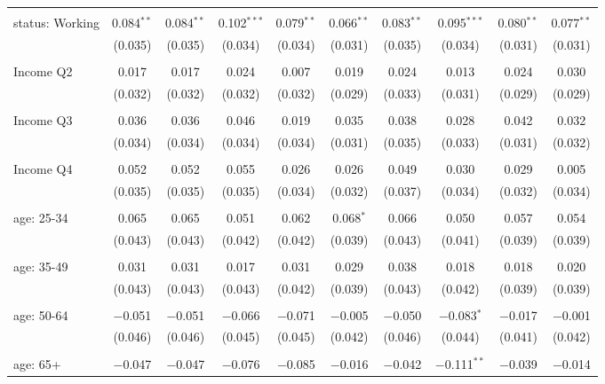 \begin{tabular}{@{\extracolsep{5pt}}lccccccccc}
  & & & & & & & & & \\ 
 status: Working & 0.084$^{**}$ & 0.084$^{**}$ & 0.102$^{***}$ & 0.079$^{**}$ & 0.066$^{**}$ & 0.083$^{**}$ & 0.095$^{***}$ & 0.080$^{**}$ & 0.077$^{**}$ \\ 
  & (0.035) & (0.035) & (0.034) & (0.034) & (0.031) & (0.035) & (0.034) & (0.031) & (0.031) \\ 
  & & & & & & & & & \\ 
 Income Q2 & 0.017 & 0.017 & 0.024 & 0.007 & 0.019 & 0.024 & 0.013 & 0.024 & 0.030 \\ 
  & (0.032) & (0.032) & (0.032) & (0.032) & (0.029) & (0.033) & (0.031) & (0.029) & (0.029) \\ 
  & & & & & & & & & \\ 
 Income Q3 & 0.036 & 0.036 & 0.046 & 0.019 & 0.035 & 0.038 & 0.028 & 0.042 & 0.032 \\ 
  & (0.034) & (0.034) & (0.034) & (0.034) & (0.031) & (0.035) & (0.033) & (0.031) & (0.032) \\ 
  & & & & & & & & & \\ 
 Income Q4 & 0.052 & 0.052 & 0.055 & 0.026 & 0.026 & 0.049 & 0.030 & 0.029 & 0.005 \\ 
  & (0.035) & (0.035) & (0.035) & (0.034) & (0.032) & (0.037) & (0.034) & (0.032) & (0.034) \\ 
  & & & & & & & & & \\ 
 age: 25-34 & 0.065 & 0.065 & 0.051 & 0.062 & 0.068$^{*}$ & 0.066 & 0.050 & 0.057 & 0.054 \\ 
  & (0.043) & (0.043) & (0.042) & (0.042) & (0.039) & (0.043) & (0.041) & (0.039) & (0.039) \\ 
  & & & & & & & & & \\ 
 age: 35-49 & 0.031 & 0.031 & 0.017 & 0.031 & 0.029 & 0.038 & 0.018 & 0.018 & 0.020 \\ 
  & (0.043) & (0.043) & (0.043) & (0.042) & (0.039) & (0.043) & (0.042) & (0.039) & (0.039) \\ 
  & & & & & & & & & \\ 
 age: 50-64 & $-$0.051 & $-$0.051 & $-$0.066 & $-$0.071 & $-$0.005 & $-$0.050 & $-$0.083$^{*}$ & $-$0.017 & $-$0.001 \\ 
  & (0.046) & (0.046) & (0.045) & (0.045) & (0.042) & (0.046) & (0.044) & (0.041) & (0.042) \\ 
  & & & & & & & & & \\ 
 age: 65+ & $-$0.047 & $-$0.047 & $-$0.076 & $-$0.085 & $-$0.016 & $-$0.042 & $-$0.111$^{**}$ & $-$0.039 & $-$0.014 \\ 

\end{tabular}
